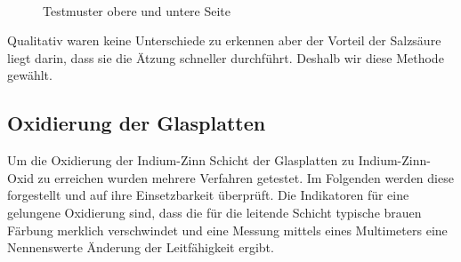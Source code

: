 \begin{figure}[t]
  \centering
~
 \caption{Testmuster obere und untere Seite}
 \end{figure}

Qualitativ waren keine Unterschiede zu erkennen aber der Vorteil der Salzsäure liegt darin, dass sie die Ätzung schneller durchführt. Deshalb wir diese Methode gewählt.

\subsection{Oxidierung der Glasplatten}


Um die Oxidierung der Indium-Zinn Schicht der Glasplatten zu Indium-Zinn-Oxid zu erreichen wurden mehrere Verfahren getestet. Im Folgenden werden diese forgestellt und auf ihre Einsetzbarkeit überprüft.
Die Indikatoren für eine gelungene Oxidierung sind, dass die für die leitende Schicht typische brauen Färbung merklich verschwindet und eine Messung mittels eines Multimeters eine Nennenswerte Änderung der Leitfähigkeit ergibt.

%


